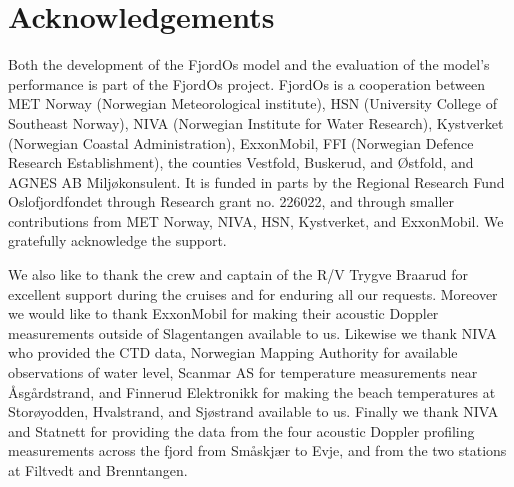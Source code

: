 \section*{\hspace{17mm}Acknowledgements}
Both the development of the FjordOs model and the evaluation of the model's performance is part of the FjordOs project. FjordOs is a cooperation between MET Norway (Norwegian Meteorological institute), HSN (University College of Southeast Norway), NIVA (Norwegian Institute for Water Research), Kystverket (Norwegian Coastal Administration), ExxonMobil, FFI (Norwegian Defence Research Establishment), the counties Vestfold, Buskerud, and {\O}stfold, and AGNES AB Milj{\o}konsulent. It is funded in parts by the Regional Research Fund Oslofjordfondet through Research grant no. 226022, and through smaller contributions from MET Norway, NIVA, HSN, Kystverket, and ExxonMobil. We gratefully acknowledge the support. 

We also like to thank the crew and captain of the R/V Trygve Braarud for excellent support during the cruises and for enduring all our requests. Moreover we would like to thank ExxonMobil for making their acoustic Doppler measurements outside of Slagentangen available to us. Likewise we thank NIVA who provided the CTD data, Norwegian Mapping Authority for available observations of water level, Scanmar AS for temperature measurements near {\AA}sg{\aa}rdstrand, and Finnerud Elektronikk for making the beach temperatures at Stor{\o}yodden, Hvalstrand, and Sj{\o}strand available to us. Finally we thank NIVA and Statnett for providing the data from the four acoustic Doppler profiling measurements across the fjord from Sm{\aa}skj{\ae}r to Evje, and from the two stations at Filtvedt and Brenntangen. 




